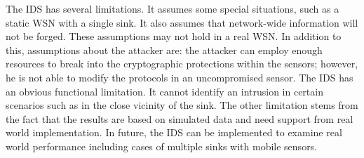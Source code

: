 \documentclass{CRPITStyle}
\begin{document}
The IDS has several limitations. 
It assumes some special situations, such as a static WSN with a single sink.
It also assumes that network-wide information will not be forged. %
These assumptions may not hold in a real WSN.
In addition to this, assumptions about the attacker are: the attacker can employ enough resources to break into the cryptographic protections within the sensors; however, he is not able to modify the protocols in an uncompromised sensor.
The IDS has an obvious functional limitation.
It cannot identify an intrusion in certain scenarios such as 
in the close vicinity of the sink.%
The other limitation stems from the fact that the results are based on simulated data and need support from real world implementation.
In future,  the IDS can be implemented to examine real world performance including cases of multiple sinks with mobile sensors.






\end{document}
